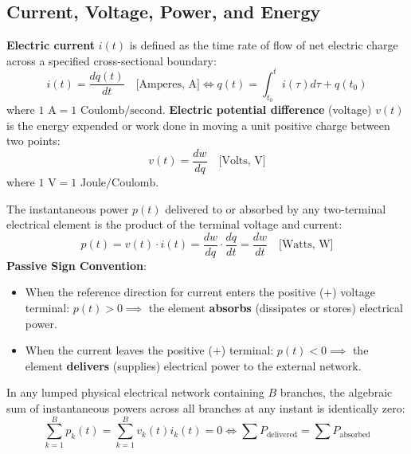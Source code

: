 \subsection{Current, Voltage, Power, and Energy}
\begin{definition}
\textbf{Electric current} $i(t)$ is defined as the time rate of flow of net electric charge across a specified cross-sectional boundary:
\begin{equation}
i(t) = \frac{dq(t)}{dt} \quad \text{[Amperes, A]} \iff q(t) = \int_{t_0}^t i(\tau) d\tau + q(t_0)
\end{equation}
where $1\text{ A} = 1\text{ Coulomb/second}$. \textbf{Electric potential difference} (voltage) $v(t)$ is the energy expended or work done in moving a unit positive charge between two points:
\begin{equation}
v(t) = \frac{dw}{dq} \quad \text{[Volts, V]}
\end{equation}
where $1\text{ V} = 1\text{ Joule/Coulomb}$.
\end{definition}

\begin{definition}
The instantaneous power $p(t)$ delivered to or absorbed by any two-terminal electrical element is the product of the terminal voltage and current:
\begin{equation}
p(t) = v(t) \cdot i(t) = \frac{dw}{dq} \cdot \frac{dq}{dt} = \frac{dw}{dt} \quad \text{[Watts, W]}
\end{equation}
\textbf{Passive Sign Convention}:
\begin{itemize}
    \item When the reference direction for current enters the positive ($+$) voltage terminal: $p(t) > 0 \implies$ the element \textbf{absorbs} (dissipates or stores) electrical power.
    \item When the current leaves the positive ($+$) terminal: $p(t) < 0 \implies$ the element \textbf{delivers} (supplies) electrical power to the external network.
\end{itemize}
\end{definition}

\begin{theorem}
In any lumped physical electrical network containing $B$ branches, the algebraic sum of instantaneous powers across all branches at any instant is identically zero:
\begin{equation}
\sum_{k=1}^B p_k(t) = \sum_{k=1}^B v_k(t) i_k(t) = 0 \iff \sum P_{\text{delivered}} = \sum P_{\text{absorbed}}
\end{equation}
\end{theorem}

